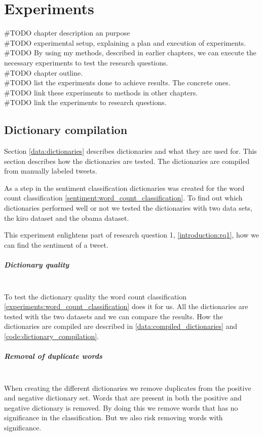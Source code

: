\chapter{Experiments}\label{experiments}
#TODO chapter description an purpose\\
#TODO experimental setup, explaining a plan and execution of experiments.  \\
#TODO By using my methods, described in earlier chapters, we can execute the
necessary experiments to test the research questions. \\
#TODO chapter outline. \\
#TODO list the experiments done to achieve results. The concrete ones. \\
#TODO link these experiments to methods in other chapters.  \\
#TODO link the experiments to research questions. \\

\section{Dictionary compilation}
Section \ref{data:dictionaries} describes dictionaries and what they are used
for. This section describes how the dictionaries are tested. 
The dictionaries are compiled from manually labeled tweets.

As a step in the sentiment classification dictionaries was created for the
word count classification \ref{sentiment:word_count_classification}.
To find out which dictionaries performed well or not we tested the dictionaries
with two data sets, the kiro dataset and the obama dataset. 

This experiment enlightens part of research question 1,
\ref{introduction:rq1}, how we can find the sentiment of a tweet.

\paragraph{Dictionary quality}
\hspace{0pt}\\
To test the dictionary quality the word count classification
\ref{experiments:word_count_classification} does it for us. All the
dictionaries are tested with the two datasets and we can compare the results. 
How the dictionaries are compiled are described in
\ref{data:compiled_dictionaries} and \ref{code:dictionary_compilation}.

\paragraph{Removal of duplicate words}
\hspace{0pt}\\
When creating the different dictionaries we remove duplicates from the positive
and negative dictionary set. Words that are present in both the positive and
negative dictionary is removed. By doing this we remove words that has no
significance in the classification. But we also risk removing words with
significance.

